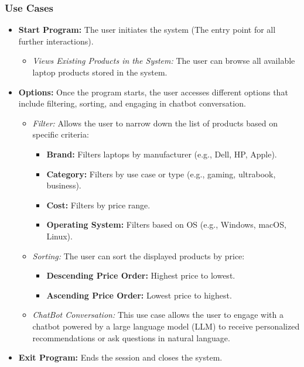 \documentclass{article}
\begin{document}
\subsubsection{Use Cases}
\begin{itemize}
    \item \textbf{Start Program:} The user initiates the system (The entry point for all further interactions).
    \begin{itemize}
        \item \textit{Views Existing Products in the System:} The user can browse all available laptop products stored in the system.
    \end{itemize}
    \item \textbf{Options:} Once the program starts, the user accesses different options that include filtering, sorting, and engaging in chatbot conversation.
    \begin{itemize}
        \item \textit{Filter:} Allows the user to narrow down the list of products based on specific criteria:
        \begin{itemize}
            \item \textbf{Brand:} Filters laptops by manufacturer (e.g., Dell, HP, Apple).
            \item \textbf{Category:} Filters by use case or type (e.g., gaming, ultrabook, business).
            \item \textbf{Cost:} Filters by price range.
            \item \textbf{Operating System:} Filters based on OS (e.g., Windows, macOS, Linux).
        \end{itemize}
        \item \textit{Sorting:} The user can sort the displayed products by price:
        \begin{itemize}
            \item \textbf{Descending Price Order:} Highest price to lowest.
            \item \textbf{Ascending Price Order:} Lowest price to highest.
        \end{itemize}
        \item \textit{ChatBot Conversation:} This use case allows the user to engage with a chatbot powered by a large language model (LLM) to receive personalized recommendations or ask questions in natural language.
    \end{itemize}
    \item \textbf{Exit Program:} Ends the session and closes the system.
\end{itemize}
\end{document}
